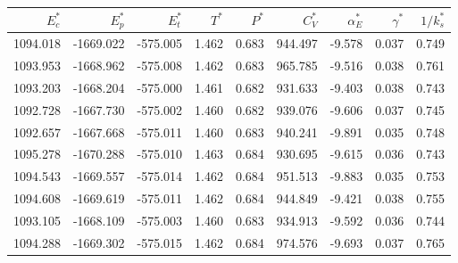 \begin{tabular}{rrrrrrrrr}
\toprule
$E_c^*$ & $E_p^*$ & $E_t^*$ & $T^*$ & $P^*$ & $C_V^*$ & $\alpha_E^*$ & $\gamma^*$ & $1/k_s^*$ \\
\midrule
1094.018 & -1669.022 & -575.005 & 1.462 & 0.683 & 944.497 & -9.578 & 0.037 & 0.749 \\
1093.953 & -1668.962 & -575.008 & 1.462 & 0.683 & 965.785 & -9.516 & 0.038 & 0.761 \\
1093.203 & -1668.204 & -575.000 & 1.461 & 0.682 & 931.633 & -9.403 & 0.038 & 0.743 \\
1092.728 & -1667.730 & -575.002 & 1.460 & 0.682 & 939.076 & -9.606 & 0.037 & 0.745 \\
1092.657 & -1667.668 & -575.011 & 1.460 & 0.683 & 940.241 & -9.891 & 0.035 & 0.748 \\
1095.278 & -1670.288 & -575.010 & 1.463 & 0.684 & 930.695 & -9.615 & 0.036 & 0.743 \\
1094.543 & -1669.557 & -575.014 & 1.462 & 0.684 & 951.513 & -9.883 & 0.035 & 0.753 \\
1094.608 & -1669.619 & -575.011 & 1.462 & 0.684 & 944.849 & -9.421 & 0.038 & 0.755 \\
1093.105 & -1668.109 & -575.003 & 1.460 & 0.683 & 934.913 & -9.592 & 0.036 & 0.744 \\
1094.288 & -1669.302 & -575.015 & 1.462 & 0.684 & 974.576 & -9.693 & 0.037 & 0.765 \\
\bottomrule
\end{tabular}

